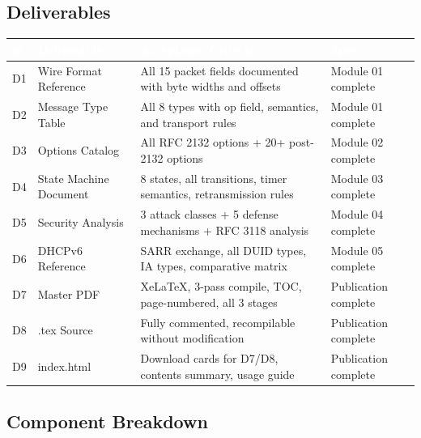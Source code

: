 \documentclass[11pt,letterpaper]{article}
\newcommand{\tableheader}[1]{\textbf{\sffamily\textcolor{white}{#1}}}
\begin{document}
\subsection{Deliverables}

\begin{center}
\begin{tabularx}{\textwidth}{C{0.6cm}L{3cm}L{3.5cm}X}
\toprule
{}
\tableheader{\#} & \tableheader{Deliverable} & \tableheader{Acceptance Criteria} & \tableheader{Spec} \\
\midrule
D1 & Wire Format Reference & All 15 packet fields documented with byte widths and offsets & Module 01 complete \\
D2 & Message Type Table & All 8 types with op field, semantics, and transport rules & Module 01 complete \\
D3 & Options Catalog & All RFC 2132 options + 20+ post-2132 options & Module 02 complete \\
D4 & State Machine Document & 8 states, all transitions, timer semantics, retransmission rules & Module 03 complete \\
D5 & Security Analysis & 3 attack classes + 5 defense mechanisms + RFC 3118 analysis & Module 04 complete \\
D6 & DHCPv6 Reference & SARR exchange, all DUID types, IA types, comparative matrix & Module 05 complete \\
D7 & Master PDF & XeLaTeX, 3-pass compile, TOC, page-numbered, all 3 stages & Publication complete \\
D8 & .tex Source & Fully commented, recompilable without modification & Publication complete \\
D9 & index.html & Download cards for D7/D8, contents summary, usage guide & Publication complete \\
\bottomrule
\end{tabularx}
\end{center}

\subsection{Component Breakdown}
\end{document}
